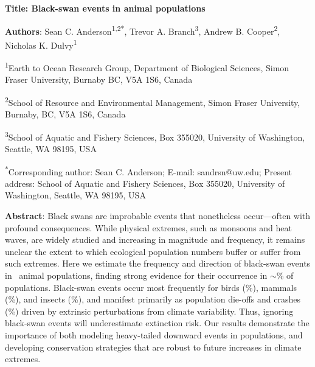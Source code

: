 \textbf{Title: Black-swan events in animal populations}

\textbf{Authors}: Sean C. Anderson\textsuperscript{1,2*}, Trevor A.
Branch\textsuperscript{3}, Andrew B. Cooper\textsuperscript{2}, Nicholas K.
Dulvy\textsuperscript{1}

\textsuperscript{1}Earth to Ocean Research Group, Department of Biological
Sciences, Simon Fraser University, Burnaby BC, V5A 1S6, Canada

\textsuperscript{2}School of Resource and Environmental Management, Simon
Fraser University, Burnaby, BC, V5A 1S6, Canada

\textsuperscript{3}School of Aquatic and Fishery Sciences, Box 355020,
University of Washington, Seattle, WA 98195, USA

\textsuperscript{*}Corresponding author: Sean C. Anderson; E-mail:
sandrsn@uw.edu; Present address: School of Aquatic and Fishery Sciences, Box
355020, University of Washington, Seattle, WA 98195, USA


\textbf{Abstract}: Black swans are improbable events that nonetheless
occur---often with profound consequences. While physical extremes, such as
monsoons and heat waves, are widely studied and increasing in magnitude and
frequency, it remains unclear the extent to which ecological population numbers
buffer or suffer from such extremes. Here we estimate the frequency and
direction of black-swan events in \NPops\ animal populations, finding strong
evidence for their occurrence in \(\sim\)\overallBasePerc \% of populations.
Black-swan events occur most frequently for birds (\birdPH \%), mammals
(\mammalsPH \%), and insects (\insectsPH \%), and manifest primarily as
population die-offs and crashes (\percBSDown \%) driven by extrinsic
perturbations from climate variability. Thus, ignoring black-swan events will
underestimate extinction risk. Our results demonstrate the importance of both
modeling heavy-tailed downward events in populations, and developing
conservation strategies that are robust to future increases in climate
extremes.



